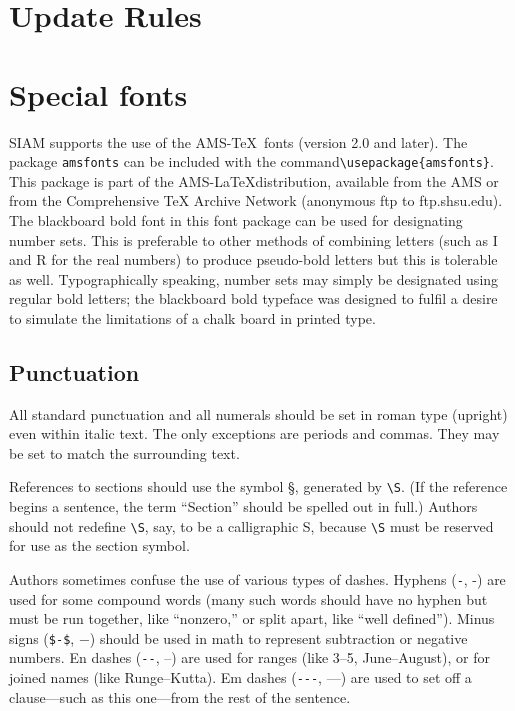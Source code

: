 \documentclass[final,leqno,onefignum,onetabnum]{siamltex1213}
\begin{document}
\section{Update Rules}



\section{Special fonts}

SIAM supports the use of the AMS-\TeX\ fonts (version 2.0
and later). The package \verb|amsfonts| can be included with
the command\linebreak \verb|\usepackage{amsfonts}|. This package
is part of the AMS-\LaTeX distribution, available
from the AMS or from the Comprehensive TeX Archive
Network (anonymous ftp to ftp.shsu.edu). The blackboard bold font in this
font package can be used for designating number sets. 
This is preferable to other methods of combining letters
(such as I and R for the real numbers) to produce pseudo-bold
letters but this is tolerable as well. Typographically speaking,
number sets may simply be designated using regular bold letters; 
the blackboard bold typeface was designed to fulfil a desire
to simulate the limitations of a chalk board in printed type.


\subsection{Punctuation}
All standard punctuation and all numerals should be set in roman type
(upright) even within italic text. The only exceptions are periods and 
commas. They may be set to match the surrounding text.

References to sections should use the symbol \S, generated by
\verb|\S|. (If the reference begins a sentence, the term ``Section''
should be spelled out in full.) Authors should not redefine
\verb|\S|, say, to be a calligraphic S, because \verb|\S|
must be reserved for use as the section symbol.  

Authors sometimes confuse the use of various types of dashes.
Hyphens (\verb|-|, -) are used for some compound words (many
such words should have no hyphen but must be run together, 
like ``nonzero,'' or split apart, like ``well defined''). 
Minus signs (\verb|$-$|, $-$)
should be used in math to represent subtraction or negative numbers.
En dashes (\verb|--|, --) are used for ranges (like 3--5, 
June--August), or for joined names (like Runge--Kutta). Em dashes
(\verb|---|, ---) are used to set off a clause---such as this 
one---from the rest of the sentence. 
\end{document}
